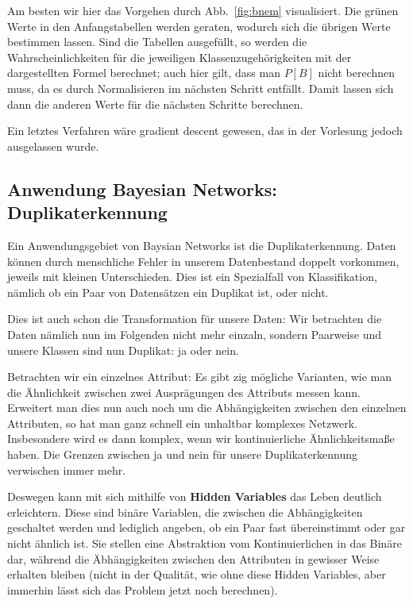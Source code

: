 Am besten wir hier das Vorgehen durch Abb.~\ref{fig:bnem} visualisiert.
Die grünen Werte in den Anfangstabellen werden geraten, wodurch sich die übrigen Werte bestimmen lassen. Sind die Tabellen ausgefüllt,
so werden die Wahrscheinlichkeiten für die jeweiligen 
Klassenzugehörigkeiten mit der dargestellten Formel berechnet; auch hier
gilt, dass man \(P[B]\) nicht berechnen muss, da es durch Normalisieren
im nächsten Schritt entfällt. Damit lassen sich dann die anderen Werte
für die nächsten Schritte berechnen.

Ein letztes Verfahren wäre gradient descent gewesen, das in der Vorlesung
jedoch ausgelassen wurde.

\subsection{Anwendung Bayesian Networks: Duplikaterkennung}
Ein Anwendungsgebiet von Baysian Networks ist die Duplikaterkennung.
Daten können durch menschliche Fehler in unserem Datenbestand
doppelt vorkommen, jeweils mit kleinen Unterschieden. Dies ist ein
Spezialfall von Klassifikation, nämlich ob ein Paar von Datensätzen ein
Duplikat ist, oder nicht. 

Dies ist auch schon die Transformation für unsere Daten: Wir 
betrachten die Daten nämlich nun im Folgenden nicht mehr
einzaln, sondern Paarweise und unsere Klassen sind nun 
Duplikat: ja oder nein.

Betrachten wir ein einzelnes Attribut: Es gibt zig mögliche Varianten,
wie man die Ähnlichkeit zwischen zwei Ausprägungen des Attributs
messen kann. Erweitert man dies nun auch noch um die Abhängigkeiten
zwischen den einzelnen Attributen, so hat man ganz schnell ein 
unhaltbar komplexes Netzwerk. Insbesondere wird es dann komplex,
wenn wir kontinuierliche Ähnlichkeitsmaße haben. Die Grenzen zwischen
ja und nein für unsere Duplikaterkennung verwischen immer mehr.

Deswegen kann mit sich mithilfe von \textbf{Hidden Variables} das
Leben deutlich erleichtern. Diese sind binäre Variablen, die zwischen
die Abhängigkeiten geschaltet werden und lediglich angeben,
ob ein Paar fast übereinstimmt oder gar nicht ähnlich ist. Sie stellen eine
Abstraktion vom Kontinuierlichen in das Binäre dar, während die
Äbhängigkeiten zwischen den Attributen in gewisser Weise erhalten
bleiben (nicht in der Qualität, wie ohne diese Hidden Variables, aber
immerhin lässt sich das Problem jetzt noch berechnen).